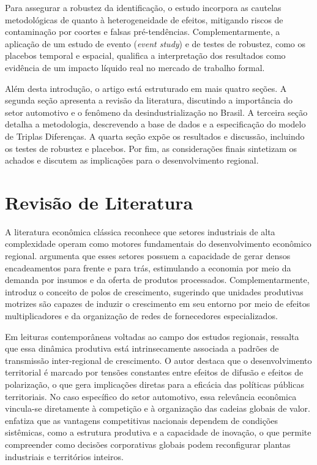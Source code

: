 \documentclass[12pt,a4paper]{article}
\begin{document}
Para assegurar a robustez da identifica\c{c}\~ao, o estudo incorpora as cautelas metodol\'ogicas de \textcite{sun2021} quanto \`a heterogeneidade de efeitos, mitigando riscos de contamina\c{c}\~ao por coortes e falsas pr\'e-tend\^encias. Complementarmente, a aplica\c{c}\~ao de um estudo de evento (\textit{event study}) e de testes de robustez, como os placebos temporal e espacial, qualifica a interpreta\c{c}\~ao dos resultados como evid\^encia de um impacto l\'iquido real no mercado de trabalho formal.

Al\'em desta introdu\c{c}\~ao, o artigo est\'a estruturado em mais quatro se\c{c}\~oes. A segunda se\c{c}\~ao apresenta a revis\~ao da literatura, discutindo a import\^ancia do setor automotivo e o fen\^omeno da desindustrializa\c{c}\~ao no Brasil. A terceira se\c{c}\~ao detalha a metodologia, descrevendo a base de dados e a especifica\c{c}\~ao do modelo de Triplas Diferen\c{c}as. A quarta se\c{c}\~ao exp\~oe os resultados e discuss\~ao, incluindo os testes de robustez e placebos. Por fim, as considera\c{c}\~oes finais sintetizam os achados e discutem as implica\c{c}\~oes para o desenvolvimento regional.

\section{Revis\~ao de Literatura}
\label{sec:lit}

A literatura econ\^omica cl\'assica reconhece que setores industriais de alta complexidade operam como motores fundamentais do desenvolvimento econ\^omico regional. \textcite{hirschman1958} argumenta que esses setores possuem a capacidade de gerar densos encadeamentos para frente e para tr\'as, estimulando a economia por meio da demanda por insumos e da oferta de produtos processados. Complementarmente, \textcite{perroux1967} introduz o conceito de polos de crescimento, sugerindo que unidades produtivas motrizes s\~ao capazes de induzir o crescimento em seu entorno por meio de efeitos multiplicadores e da organiza\c{c}\~ao de redes de fornecedores especializados.

Em leituras contempor\^aneas voltadas ao campo dos estudos regionais, \textcite{yeung2017} ressalta que essa din\^amica produtiva est\'a intrinsecamente associada a padr\~oes de transmiss\~ao inter-regional de crescimento. O autor destaca que o desenvolvimento territorial \'e marcado por tens\~oes constantes entre efeitos de difus\~ao e efeitos de polariza\c{c}\~ao, o que gera implica\c{c}\~oes diretas para a efic\'acia das pol\'iticas p\'ublicas territoriais. No caso espec\'ifico do setor automotivo, essa relev\^ancia econ\^omica vincula-se diretamente \`a competi\c{c}\~ao e \`a organiza\c{c}\~ao das cadeias globais de valor. \textcite{porter1990} enfatiza que as vantagens competitivas nacionais dependem de condi\c{c}\~oes sist\^emicas, como a estrutura produtiva e a capacidade de inova\c{c}\~ao, o que permite compreender como decis\~oes corporativas globais podem reconfigurar plantas industriais e territ\'orios inteiros.
\end{document}
